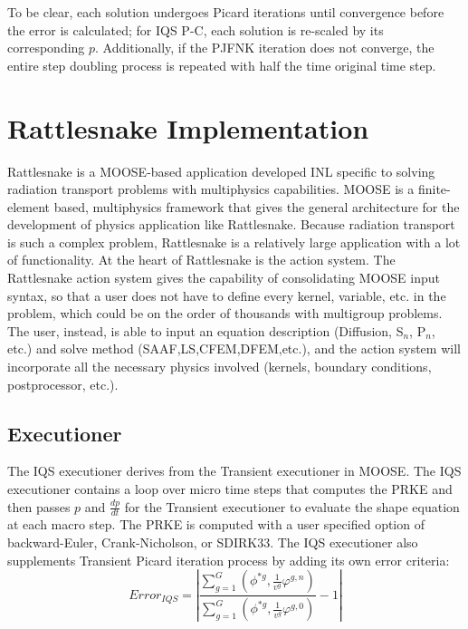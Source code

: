 \documentclass[12pt]{scrartcl}
\newcommand{\be}{\begin{equation}}
\newcommand{\ee}{\end{equation}}
\begin{document}
To be clear, each solution undergoes Picard iterations until convergence before the error is calculated; for IQS P-C, each solution is re-scaled by its corresponding $p$.  Additionally, if the PJFNK iteration does not converge, the entire step doubling process is repeated with half the time original time step. 

\section{Rattlesnake Implementation}

Rattlesnake is a MOOSE-based application developed INL specific to solving radiation transport problems with multiphysics capabilities.  MOOSE is a finite-element based, multiphysics framework that gives the general architecture for the development of physics application like Rattlesnake.  Because radiation transport is such a complex problem, Rattlesnake is a relatively large application with a lot of functionality.  At the heart of Rattlesnake is the action system.  The Rattlesnake action system gives the capability of consolidating MOOSE input syntax, so that a user does not have to define every kernel, variable, etc. in the problem, which could be on the order of thousands with multigroup problems.  The user, instead, is able to input an equation description (Diffusion, S$_n$, P$_n$, etc.) and solve method (SAAF,LS,CFEM,DFEM,etc.), and the action system will incorporate all the necessary physics involved (kernels, boundary conditions, postprocessor, etc.).

 
\subsection{Executioner}

The IQS executioner derives from the Transient executioner in MOOSE.  The IQS executioner contains a loop over micro time steps that computes the PRKE and then passes $p$ and $\frac{dp}{dt}$ for the Transient executioner to evaluate the shape equation at each macro step.  The PRKE is computed with a user specified option of backward-Euler, Crank-Nicholson, or SDIRK33.   The IQS executioner also supplements Transient Picard iteration process by adding its own error criteria:
\be
Error_{IQS}=\left|\frac{\sum_{g=1}^G\left(\phi^{*g},\frac{1}{v^g}\varphi^{g,n}\right)}{\sum_{g=1}^G\left(\phi^{*g},\frac{1}{v^g}\varphi^{g,0}\right)}-1\right|
\label{eq:eiqs}
\ee
\end{document}
